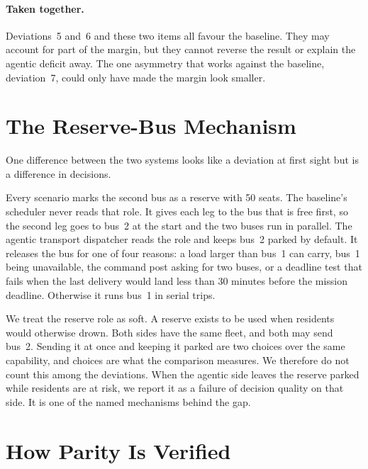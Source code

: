 \paragraph{Taken together.} Deviations~5 and~6 and these two items all favour
the baseline. They may account for part of the margin, but they cannot reverse
the result or explain the agentic deficit away. The one asymmetry that works
against the baseline, deviation~7, could only have made the margin look
smaller.

\section{The Reserve-Bus Mechanism}
\label{sec:val:reserve}

One difference between the two systems looks like a deviation at first sight
but is a difference in decisions.

Every scenario marks the second bus as a reserve with 50 seats. The baseline's
scheduler never reads that role. It gives each leg to the bus that is free
first, so the second leg goes to bus~2 at the start and the two buses run in
parallel. The agentic transport dispatcher reads the role and keeps bus~2
parked by default. It releases the bus for one of four reasons: a load larger
than bus~1 can carry, bus~1 being unavailable, the command post asking for two
buses, or a deadline test that fails when the last delivery would land less
than 30 minutes before the mission deadline. Otherwise it runs bus~1 in serial
trips.

We treat the reserve role as soft. A reserve exists to be used when residents
would otherwise drown. Both sides have the same fleet, and both may send bus~2.
Sending it at once and keeping it parked are two choices over the same
capability, and choices are what the comparison measures. We therefore do not
count this among the deviations. When the agentic side leaves the reserve
parked while residents are at risk, we report it as a failure of decision
quality on that side. It is one of the named mechanisms behind the gap.

\section{How Parity Is Verified}
\label{sec:val:verification}


